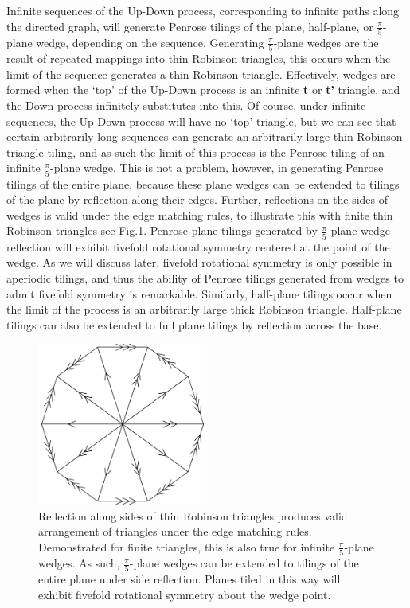 \documentclass[
  oneside,
  11pt, a4paper,
  footinclude=true,
  headinclude=true,
  cleardoublepage=empty
]{scrbook}
\begin{document}
Infinite sequences of the Up-Down process, corresponding to infinite paths along the directed graph, will generate Penrose tilings of the plane, half-plane, or $\frac{\pi}{5}$-plane wedge, depending on the sequence. Generating $\frac{\pi}{5}$-plane wedges are the result of repeated mappings into thin Robinson triangles, this occurs when the limit of the sequence generates a thin Robinson triangle. Effectively, wedges are formed when the `top' of the Up-Down process is an infinite \textbf{t} or \textbf{t'} triangle, and the Down process infinitely substitutes into this. Of course, under infinite sequences, the Up-Down process will have no `top' triangle, but we can see that certain arbitrarily long sequences can generate an arbitrarily large thin Robinson triangle tiling, and as such the limit of this process is the Penrose tiling of an infinite $\frac{\pi}{5}$-plane wedge. This is not a problem, however, in generating Penrose tilings of the entire plane, because these plane wedges can be extended to tilings of the plane by reflection along their edges. Further, reflections on the sides of wedges is valid under the edge matching rules, to illustrate this with finite thin Robinson triangles see Fig.\ref{fig:WedgeWheel}.  Penrose plane tilings generated by $\frac{\pi}{5}$-plane wedge reflection will exhibit fivefold rotational symmetry centered at the point of the wedge. As we will discuss later, fivefold rotational symmetry is only possible in aperiodic tilings, and thus the ability of Penrose tilings generated from wedges to admit fivefold symmetry is remarkable. Similarly, half-plane tilings occur when the limit of the process is an arbitrarily large thick Robinson triangle. Half-plane tilings can also be extended to full plane tilings by reflection across the base.

\begin{figure}
\centering
\includegraphics[width=0.5\textwidth]{WedgeWheel}
\caption[Reflection along $\frac{\pi}{5}$-plane Wedge Edges]{Reflection along sides of thin Robinson triangles produces valid arrangement of triangles under the edge matching rules. Demonstrated for finite triangles, this is also true for infinite  $\frac{\pi}{5}$-plane wedges. As such,  $\frac{\pi}{5}$-plane wedges can be extended to tilings of the entire plane under side reflection. Planes tiled in this way will exhibit fivefold rotational symmetry about the wedge point.}
\label{fig:WedgeWheel}
\end{figure}
\end{document}
